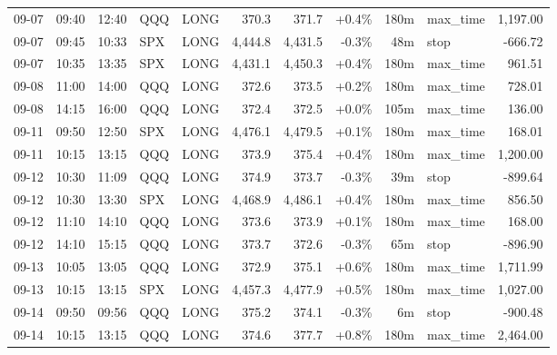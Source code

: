 \documentclass[11pt,a4paper,twoside]{article}
\begin{document}
\begin{center}
\begin{longtable}{>{\color{txtmain}}l l l l l r r r r >{\color{txtmain}}l r}
09-07 & 09:40 & 12:40 & QQQ & LONG & 370.3 & 371.7 & \textcolor{wingreen}{+0.4\%} & 180m & max\_time & \textcolor{wingreen}{1,197.00} \\
09-07 & 09:45 & 10:33 & SPX & LONG & 4,444.8 & 4,431.5 & \textcolor{lossred}{-0.3\%} & 48m & stop & \textcolor{lossred}{-666.72} \\
09-07 & 10:35 & 13:35 & SPX & LONG & 4,431.1 & 4,450.3 & \textcolor{wingreen}{+0.4\%} & 180m & max\_time & \textcolor{wingreen}{961.51} \\
09-08 & 11:00 & 14:00 & QQQ & LONG & 372.6 & 373.5 & \textcolor{wingreen}{+0.2\%} & 180m & max\_time & \textcolor{wingreen}{728.01} \\
09-08 & 14:15 & 16:00 & QQQ & LONG & 372.4 & 372.5 & \textcolor{wingreen}{+0.0\%} & 105m & max\_time & \textcolor{wingreen}{136.00} \\
09-11 & 09:50 & 12:50 & SPX & LONG & 4,476.1 & 4,479.5 & \textcolor{wingreen}{+0.1\%} & 180m & max\_time & \textcolor{wingreen}{168.01} \\
09-11 & 10:15 & 13:15 & QQQ & LONG & 373.9 & 375.4 & \textcolor{wingreen}{+0.4\%} & 180m & max\_time & \textcolor{wingreen}{1,200.00} \\
09-12 & 10:30 & 11:09 & QQQ & LONG & 374.9 & 373.7 & \textcolor{lossred}{-0.3\%} & 39m & stop & \textcolor{lossred}{-899.64} \\
09-12 & 10:30 & 13:30 & SPX & LONG & 4,468.9 & 4,486.1 & \textcolor{wingreen}{+0.4\%} & 180m & max\_time & \textcolor{wingreen}{856.50} \\
09-12 & 11:10 & 14:10 & QQQ & LONG & 373.6 & 373.9 & \textcolor{wingreen}{+0.1\%} & 180m & max\_time & \textcolor{wingreen}{168.00} \\
09-12 & 14:10 & 15:15 & QQQ & LONG & 373.7 & 372.6 & \textcolor{lossred}{-0.3\%} & 65m & stop & \textcolor{lossred}{-896.90} \\
09-13 & 10:05 & 13:05 & QQQ & LONG & 372.9 & 375.1 & \textcolor{wingreen}{+0.6\%} & 180m & max\_time & \textcolor{wingreen}{1,711.99} \\
09-13 & 10:15 & 13:15 & SPX & LONG & 4,457.3 & 4,477.9 & \textcolor{wingreen}{+0.5\%} & 180m & max\_time & \textcolor{wingreen}{1,027.00} \\
09-14 & 09:50 & 09:56 & QQQ & LONG & 375.2 & 374.1 & \textcolor{lossred}{-0.3\%} & 6m & stop & \textcolor{lossred}{-900.48} \\
09-14 & 10:15 & 13:15 & QQQ & LONG & 374.6 & 377.7 & \textcolor{wingreen}{+0.8\%} & 180m & max\_time & \textcolor{wingreen}{2,464.00} \\

\end{longtable}
\end{center}
\end{document}
